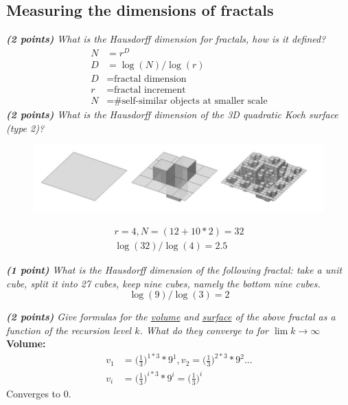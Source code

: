 \documentclass[a4paper,10pt]{article}
\begin{document}
\subsection{Measuring the dimensions of fractals}
\textit{\textbf{(2 points)} What is the Hausdorff dimension for fractals, how is it defined?}
\[\begin{aligned}
N&=r^D\\
D&=\log(N)/\log(r)\\
D&=\text{fractal dimension}\\
r&=\text{fractal increment}\\
N&=\text{\# self-similar objects at smaller scale}
\end{aligned}\]
\textit{\textbf{(2 points)} What is the Hausdorff dimension of the 3D quadratic Koch surface (type 2)?}\\

\begin{figure}[H]
	\centering
	\includegraphics[width=.7\textwidth]{5-koch}
\end{figure}
\[\begin{aligned}
r=4,N=(12+10*2)=32\\
\log(32)/\log(4)=2.5
\end{aligned}\]

\textit{\textbf{(1 point)} What is the Hausdorff dimension of the following fractal: take a unit cube, split it into 27 cubes, keep nine cubes, namely the bottom nine cubes.
}\\

\[\log(9)/\log(3)=2\]

\textit{\textbf{(2 points)} Give formulas for the \underline{volume} and \underline{surface} of the above fractal as a function of the recursion level $k$. What do they converge to for $\lim k\rightarrow\infty$}\\

\textbf{Volume:}
\[\begin{aligned}
v_1&=\Big(\frac{1}{3}\Big)^{1*3}*9^1,v_2=\Big(\frac{1}{3}\Big)^{2*3}*9^2...\\
v_i&=\Big(\frac{1}{3}\Big)^{i*3}*9^i=\Big(\frac{1}{3}\Big)^{i}
\end{aligned}\]
Converges to 0.\\
\end{document}

